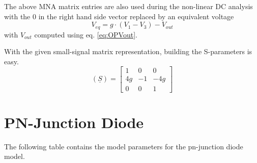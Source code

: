 The above MNA matrix entries are also used during the non-linear DC
analysis with the 0 in the right hand side vector replaced by an
equivalent voltage
\begin{equation}
V_{eq} = g\cdot \left(V_1 - V_3\right) - V_{out}
\end{equation}
with $V_{out}$ computed using eq. \eqref{eq:OPVout}.

\addvspace{12pt}

With the given small-signal matrix representation, building the
S-parameters is easy.
\begin{equation}
(\underline{S}) =
\begin{bmatrix}
 1  &  0 & 0  \\
 4g & -1 & -4g\\
 0  &  0 &  1
\end{bmatrix}
\end{equation}


\section{PN-Junction Diode}

The following table contains the model parameters for the pn-junction
diode model.

\addvspace{12pt}

